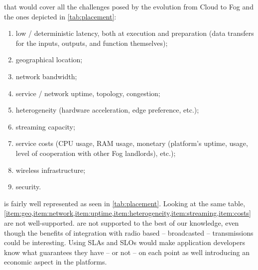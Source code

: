 \documentclass[11pt]{sdm}
\begin{document}
\begin{description}[leftmargin=10pt]
	\item[Lack of \acrfullpl{SLA}] that would cover all the challenges posed by the evolution from Cloud to Fog \cite{chiang_fog_2016, bonomi_fog_2012} and the ones depicted in \cref{tab:placement}:
		\begin{enumerate}[(1)]
			\item \label{item:latency} low / deterministic latency, both at execution and preparation (data transfers for the inputs, outputs, and function themselves);
			\item \label{item:geo} geographical location;
			\item \label{item:network} network bandwidth;
			\item \label{item:uptime} service / network uptime, topology, congestion;
			\item \label{item:heterogeneity} heterogeneity (hardware acceleration, edge preference, etc.);
			\item \label{item:streaming} streaming capacity;
			\item \label{item:costs} service costs (CPU usage, RAM usage, monetary (platform's uptime, usage, level of cooperation with other Fog landlords), etc.);
			\item \label{item:wireless} wireless infrastructure;
			\item \label{item:security} security.
		\end{enumerate}
		 is fairly well represented as seen in \cref{tab:placement}. Looking at the same table, \cref{item:geo,item:network,item:uptime,item:heterogeneity,item:streaming,item:costs} are not well-supported.  are not supported to the best of our knowledge, even though the benefits of integration with radio based -- broadcasted -- transmissions could be interesting. Using \glspl{SLA} and \glspl{SLO} would make application developers know what guarantees they have -- or not -- on each point as well introducing an economic aspect in the platforms.


\end{description}
\end{document}
